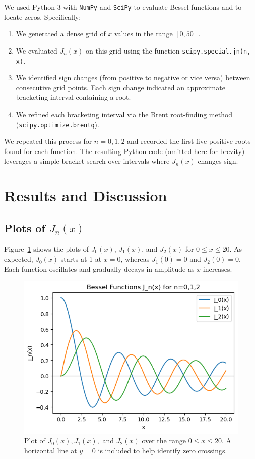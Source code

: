 \documentclass{article}
\begin{document}
We used Python 3 with \texttt{NumPy} and \texttt{SciPy} to evaluate Bessel 
functions and to locate zeros. Specifically:
\begin{enumerate}
    \item We generated a dense grid of $x$ values in the range $[0, 50]$.
    \item We evaluated $J_n(x)$ on this grid using the function 
          \texttt{scipy.special.jn(n, x)}.
    \item We identified sign changes (from positive to negative or vice versa) 
          between consecutive grid points. Each sign change indicated an 
          approximate bracketing interval containing a root.
    \item We refined each bracketing interval via the Brent root-finding method 
          (\texttt{scipy.optimize.brentq}).
\end{enumerate}

We repeated this process for $n=0,1,2$ and recorded the first five positive 
roots found for each function. The resulting Python code (omitted here for 
brevity) leverages a simple bracket‐search over intervals where $J_n(x)$ 
changes sign. 

\section{Results and Discussion} \label{sec:results}

\subsection{Plots of \texorpdfstring{$J_n(x)$}{Jn(x)}}

Figure~\ref{fig:bessel_plot} shows the plots of $J_0(x)$, $J_1(x)$, and $J_2(x)$ 
for $0 \le x \le 20$. As expected, $J_0(x)$ starts at 1 at $x=0$, whereas 
$J_1(0) = 0$ and $J_2(0) = 0$. Each function oscillates and gradually decays 
in amplitude as $x$ increases.

\begin{figure}[ht]
\centering
\includegraphics[width=0.9\linewidth]{img/bessel_plot.png} 
\caption{Plot of $J_0(x), J_1(x),$ and $J_2(x)$ over the range $0 \le x \le 20$. 
A horizontal line at $y=0$ is included to help identify zero crossings.}
\label{fig:bessel_plot}
\end{figure}
\end{document}
